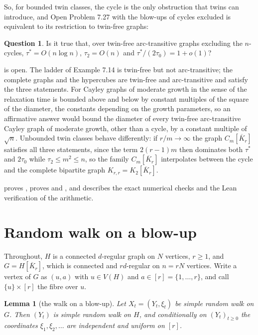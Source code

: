 \documentclass[11pt]{amsart}
\newtheorem{lemma}[theorem]{Lemma}
\theoremstyle{definition}
\newtheorem{question}[theorem]{Question}
\newcommand{\Kbar}{\overline{K}}
\begin{document}
So, for bounded twin classes, the cycle is the only obstruction that twins can introduce, and Open Problem 7.27 with the blow-ups of cycles excluded is equivalent to its restriction to twin-free graphs:

\begin{question}\label{q:twinfree}
Is it true that, over twin-free arc-transitive graphs excluding the $n$-cycles, $\tau^*=O(n\log n)$, $\tau_2=O(n)$ and $\tau^*/(2\tau_0)=1+o(1)$?
\end{question}

 is open. The ladder of Example 7.14 is twin-free but not arc-transitive; the complete graphs and the hypercubes are twin-free and arc-transitive and satisfy the three statements. For Cayley graphs of moderate growth in the sense of \cite{DSC} the relaxation time is bounded above and below by constant multiples of the square of the diameter, the constants depending on the growth parameters, so an affirmative answer would bound the diameter of every twin-free arc-transitive Cayley graph of moderate growth, other than a cycle, by a constant multiple of $\sqrt n$. Unbounded twin classes behave differently: if $r/m\to\infty$ the graph $C_m[\Kbar_r]$ satisfies all three statements, since the term $2(r-1)m$ then dominates both $\tau^*$ and $2\tau_0$ while $\tau_2\le m^2\le n$, so the family $C_m[\Kbar_r]$ interpolates between the cycle and the complete bipartite graph $K_{r,r}=K_2[\Kbar_r]$.

 proves ,  proves  and , and  describes the exact numerical checks and the Lean verification of the arithmetic.

\section{Random walk on a blow-up}\label{sec:blowup}

Throughout, $H$ is a connected $d$-regular graph on $N$ vertices, $r\ge1$, and $G=H[\Kbar_r]$, which is connected and $rd$-regular on $n=rN$ vertices. Write a vertex of $G$ as $(u,a)$ with $u\in V(H)$ and $a\in[r]=\{1,\dots,r\}$, and call $\{u\}\times[r]$ the fibre over $u$.

\begin{lemma}[the walk on a blow-up]\label{lem:projection}
Let $X_t=(Y_t,\xi_t)$ be simple random walk on $G$. Then $(Y_t)$ is simple random walk on $H$, and conditionally on $(Y_t)_{t\ge0}$ the coordinates $\xi_1,\xi_2,\dots$ are independent and uniform on $[r]$.
\end{lemma}
\end{document}
